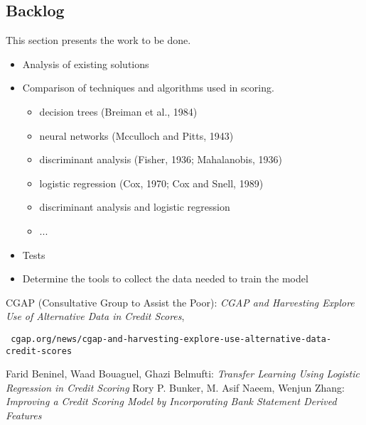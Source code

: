 \documentclass[12pt,a4paper]{amsart}
\numberwithin{equation}{section}
\theoremstyle{plain}
\theoremstyle{definition}
\begin{document}
\subsection{Backlog}
This section presents the work to be done.\\
\begin{itemize}
 \item Analysis of existing solutions
 \item Comparison of techniques and algorithms used in scoring.
\begin{itemize}
  \item decision trees (Breiman et al., 1984)
  \item neural networks (Mcculloch and Pitts, 1943)
  \item discriminant analysis (Fisher, 1936; Mahalanobis, 1936)
  \item logistic regression (Cox, 1970; Cox and Snell, 1989)
  \item discriminant analysis and logistic regression
  \item ...
\end{itemize}
 \item Tests
 \item Determine the tools to collect the data needed to train the model

\end{itemize}



\begin{thebibliography}{99} 

 CGAP (Consultative Group to Assist the Poor): \textit{CGAP and Harvesting Explore Use of Alternative Data in Credit Scores}, \begin{verbatim} cgap.org/news/cgap-and-harvesting-explore-use-alternative-data-credit-scores
\end{verbatim}
 Farid Beninel, Waad Bouaguel, Ghazi Belmufti: \textit{Transfer Learning Using Logistic Regression in Credit Scoring}
 Rory P. Bunker, M. Asif Naeem, Wenjun Zhang: \textit{Improving a Credit Scoring Model by Incorporating Bank Statement Derived Features}

\end{thebibliography}
\end{document}
